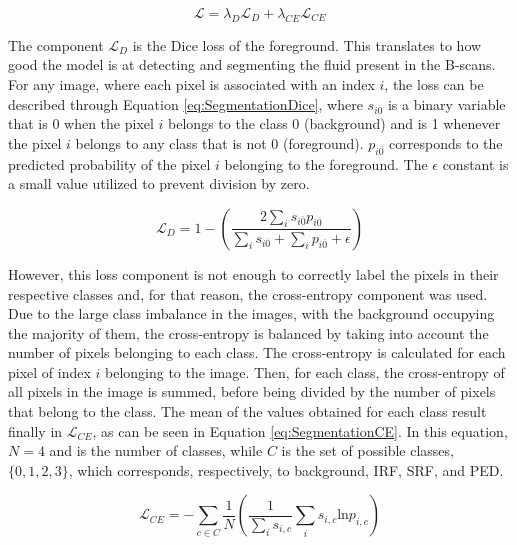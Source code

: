 \begin{equation}
	\mathcal{L} = \lambda_{D} \mathcal{L}_{D} + \lambda_{CE} \mathcal{L}_{CE}
	\label{eq:SegmentationLoss}
\end{equation}

The component $\mathcal{L}_{D}$ is the Dice loss of the foreground. This translates to how good the model is at detecting and segmenting the fluid present in the B-scans. For any image, where each pixel is associated with an index $i$, the loss can be described through Equation \ref{eq:SegmentationDice}, where $s_{i\overline{0}}$ is a binary variable that is 0 when the pixel $i$ belongs to the class 0 (background) and is 1 whenever the pixel $i$ belongs to any class that is not 0 (foreground). $p_{i\overline{0}}$ corresponds to the predicted probability of the pixel $i$ belonging to the foreground. The $\epsilon$ constant is a small value utilized to prevent division by zero.

\begin{equation}
	\mathcal{L}_{D} = 1 - \left( \frac{2 \sum_{i} s_{i\overline{0}} p_{i\overline{0}}}{\sum_{i} s_{i\overline{0}} + \sum_{i} p_{i\overline{0}} + \epsilon} \right)
	\label{eq:SegmentationDice}
\end{equation}

However, this loss component is not enough to correctly label the pixels in their respective classes and, for that reason, the cross-entropy component was used. Due to the large class imbalance in the images, with the background occupying the majority of them, the cross-entropy is balanced by taking into account the number of pixels belonging to each class. The cross-entropy is calculated for each pixel of index $i$ belonging to the image. Then, for each class, the cross-entropy of all pixels in the image is summed, before being divided by the number of pixels that belong to the class. The mean of the values obtained for each class result finally in $\mathcal{L}_{CE}$, as can be seen in Equation \ref{eq:SegmentationCE}. In this equation, $N=4$ and is the number of classes, while $C$ is the set of possible classes, $\{0,1,2,3\}$, which corresponds, respectively, to background, IRF, SRF, and PED.

\begin{equation}
	\mathcal{L}_{CE} = - \sum_{c \in C} \frac{1}{N}\left( \frac{1}{\sum_{i} s_{i,c}} \sum_{i} s_{i,c} \text{ln} p_{i,c} \right)
	\label{eq:SegmentationCE}
\end{equation}

